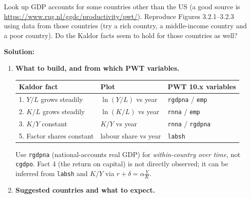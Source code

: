 \documentclass[12pt, letterpaper]{article}
\begin{document}
\begin{tcolorbox}[evenbox,title={Problem 3.2 \quad The Kaldor Facts in Other Countries}]
\begin{tcolorbox}[questionbox]
Look up GDP accounts for some countries other than the US (a good source is
\url{https://www.rug.nl/ggdc/productivity/pwt/}). Reproduce Figures 3.2.1--3.2.3 using data
from those countries (try a rich country, a middle-income country and a poor country). Do the
Kaldor facts seem to hold for those countries as well?
\end{tcolorbox}

\textbf{Solution:}

\begin{enumerate}

\item \textbf{What to build, and from which PWT variables.}

\begin{center}
\begin{tabular}{lll}
\toprule
\textbf{Kaldor fact} & \textbf{Plot} & \textbf{PWT 10.x variables} \\
\midrule
1. $Y/L$ grows steadily & $\ln(Y/L)$ vs year & \texttt{rgdpna} / \texttt{emp} \\
2. $K/L$ grows steadily & $\ln(K/L)$ vs year & \texttt{rnna} / \texttt{emp} \\
3. $K/Y$ constant       & $K/Y$ vs year      & \texttt{rnna} / \texttt{rgdpna} \\
5. Factor shares constant & labour share vs year & \texttt{labsh} \\
\bottomrule
\end{tabular}
\end{center}

Use \texttt{rgdpna} (national-accounts real GDP) for \emph{within-country over time}, not
\texttt{cgdpo}. Fact 4 (the return on capital) is not directly observed; it can be inferred
from \texttt{labsh} and $K/Y$ via $r + \delta = \alpha \frac{Y}{K}$.

\item \textbf{Suggested countries and what to expect.}


\end{enumerate}
\end{tcolorbox}
\end{document}
